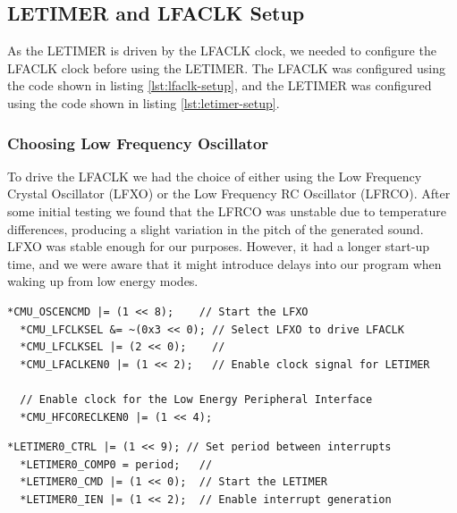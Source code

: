 
\subsection{LETIMER and LFACLK Setup}
As the LETIMER is driven by the LFACLK clock, we needed to configure the LFACLK clock before using the LETIMER. The LFACLK was configured using the code shown in listing \ref{lst:lfaclk-setup}, and the LETIMER was configured using the code shown in listing \ref{lst:letimer-setup}. 

\subsubsection{Choosing Low Frequency Oscillator}
To drive the LFACLK we had the choice of either using the Low Frequency Crystal Oscillator (LFXO) or the Low Frequency RC Oscillator (LFRCO). After some initial testing we found that the LFRCO was unstable due to temperature differences, producing a slight variation in the pitch of the generated sound. LFXO was stable enough for our purposes. However, it had a longer start-up time, and we were aware that it might introduce delays into our program when waking up from low energy modes. \cite{efm32-oscillator-design-considerations-application-note} \\
 
\noindent\begin{minipage}[c]{\textwidth}
  \begin{lstlisting}[caption=Setting up the LFACLK to drive the LETIMER ,label={lst:lfaclk-setup}]
  *CMU_OSCENCMD |= (1 << 8);    // Start the LFXO
  *CMU_LFCLKSEL &= ~(0x3 << 0); // Select LFXO to drive LFACLK
  *CMU_LFCLKSEL |= (2 << 0);    //
  *CMU_LFACLKEN0 |= (1 << 2);   // Enable clock signal for LETIMER 

  // Enable clock for the Low Energy Peripheral Interface
  *CMU_HFCORECLKEN0 |= (1 << 4);
  \end{lstlisting}
\end{minipage}

\noindent\begin{minipage}[c]{\textwidth}
  \begin{lstlisting}[caption=Setting up LETIMER to generate periodic interrupts,label={lst:letimer-setup}]
  *LETIMER0_CTRL |= (1 << 9); // Set period between interrupts
  *LETIMER0_COMP0 = period;   // 
  *LETIMER0_CMD |= (1 << 0);  // Start the LETIMER
  *LETIMER0_IEN |= (1 << 2);  // Enable interrupt generation
  \end{lstlisting}
\end{minipage}

